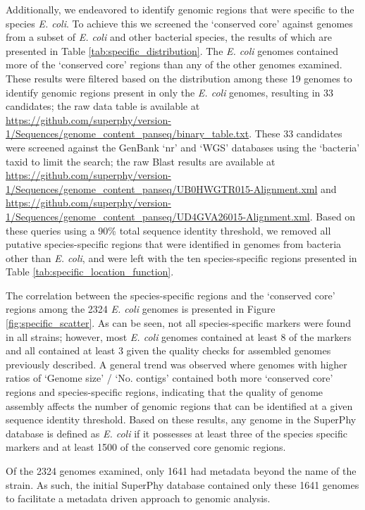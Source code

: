 \documentclass[doublespacing, linenumbers]{bmcart}
\begin{document}
Additionally, we endeavored to identify genomic regions that were specific to the species \textit{E. coli}. To achieve this we screened the `conserved core' against genomes from a subset of \textit{E. coli} and other bacterial species, the results of which are presented in Table \ref{tab:specific_distribution}. The \textit{E. coli} genomes contained more of the `conserved core' regions than any of the other genomes examined. These results were filtered based on the distribution among these 19 genomes to identify genomic regions present in only the \textit{E. coli} genomes, resulting in  33 candidates; the raw data table is available at \url{https://github.com/superphy/version-1/Sequences/genome_content_panseq/binary_table.txt}. These 33 candidates were screened against the GenBank `nr' and `WGS' databases using the `bacteria' taxid to limit the search; the raw Blast results are available at \url{https://github.com/superphy/version-1/Sequences/genome_content_panseq/UB0HWGTR015-Alignment.xml} and \url{https://github.com/superphy/version-1/Sequences/genome_content_panseq/UD4GVA26015-Alignment.xml}. Based on these queries using a 90\% total sequence identity threshold, we removed all putative species-specific regions that were identified in genomes from bacteria other than \textit{E. coli}, and were left with the ten species-specific regions presented in Table \ref{tab:specific_location_function}.

The correlation between the species-specific regions and the `conserved core' regions among the 2324 \textit{E. coli} genomes is presented in Figure \ref{fig:specific_scatter}. As can be seen, not all species-specific markers were found in all strains; however, most \textit{E. coli} genomes contained at least 8 of the markers and all contained at least 3 given the quality checks for assembled genomes previously described. A general trend was observed where genomes with higher ratios of `Genome size' / `No. contigs' contained both more `conserved core' regions and species-specific regions, indicating that the quality of genome assembly affects the number of genomic regions that can be identified at a given sequence identity threshold. Based on these results, any genome in the SuperPhy database is defined as \textit{E. coli} if it possesses at least three of the species specific markers and at least 1500 of the conserved core genomic regions.

Of the 2324 genomes examined, only 1641 had metadata beyond the name of the strain. As such, the initial SuperPhy database contained only these 1641 genomes to facilitate a metadata driven approach to genomic analysis.
\end{document}
